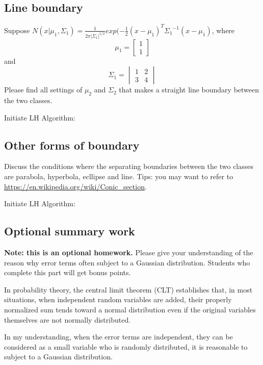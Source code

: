 \documentclass{article}
\newenvironment{answer}{\par\color{ForestGreen}}{\par}
\begin{document}
\subsection{Line boundary}
Suppose $N(x|\mu_1, \Sigma_1) = \frac{1}{{2\pi|\Sigma_1|}^{1/2}}exp{(-\frac{1}{2} (x - \mu_1)^T{\Sigma_1}^{-1}(x - \mu_1)}$, where
$$\mu_1 = \begin{bmatrix}1 \\ 1\end{bmatrix} $$
and $$\Sigma_1 = \begin{vmatrix}1 & 2 \\ 3 &4\end{vmatrix} $$
Please find all settings of $\mu_2$ and $\Sigma_2$ that makes a straight line boundary between the two classes.
\begin{answer}
    Initiate LH Algorithm:
\end{answer}

\subsection{Other forms of boundary}
Discuss the conditions where the separating boundaries between the two classes are parabola,
hyperbola, ecllipse and line. Tips: you may want to refer to \url{ https://en.wikipedia.org/wiki/Conic_section}.
\begin{answer}
    Initiate LH Algorithm:
\end{answer}

\subsection{Optional summary work}
\textbf{Note: this is an optional homework.} Please give your understanding of the reason
why error terms often subject to a Gaussian distribution. Students who complete this part
will get bonus points.

\begin{answer}
    In probability theory, the central limit theorem (CLT) establishes that, in most situations, when independent random variables are added, their properly normalized sum tends toward a normal distribution even if the original variables themselves are not normally distributed.

    In my understanding, when the error terms are independent, they can be considered as a small variable who is randomly distributed, it is reasonable to subject to a Gaussian distribution.
\end{answer}
\end{document}
